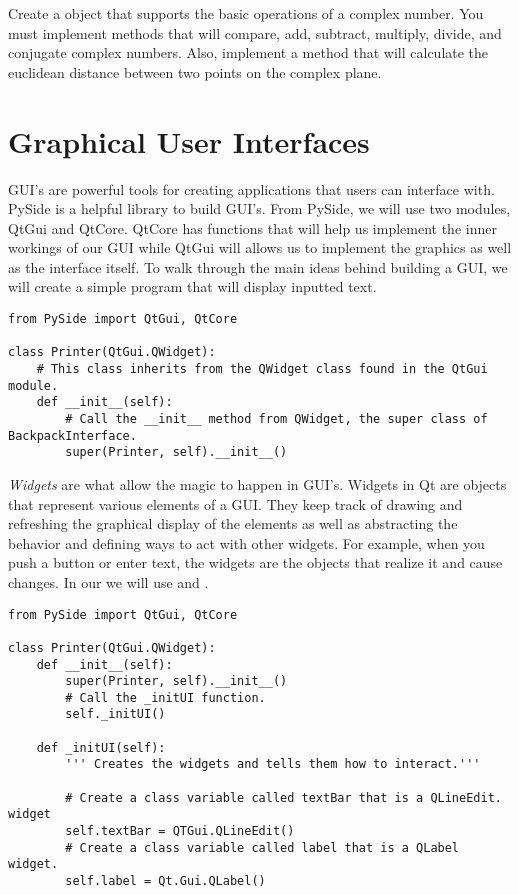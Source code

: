 \begin{problem}
Create a  object that supports the basic operations of a complex number.
You must implement methods that will compare, add, subtract, multiply, divide, and conjugate complex numbers.
Also, implement a  method that will calculate the euclidean distance between two points on the complex plane.
\label{prob:complexNum}
\end{problem}

\section*{Graphical User Interfaces}

GUI's are powerful tools for creating applications that users can interface with.
PySide is a helpful library to build GUI's.
From PySide, we will use two modules, QtGui and QtCore.
QtCore has functions that will help us implement the inner workings of our GUI while QtGui will allows us to implement the graphics as well as the interface itself.
To walk through the main ideas behind building a GUI, we will create a simple program that will display inputted text.

\begin{lstlisting}
from PySide import QtGui, QtCore

class Printer(QtGui.QWidget):
	# This class inherits from the QWidget class found in the QtGui module.
	def __init__(self):
		# Call the __init__ method from QWidget, the super class of BackpackInterface.
		super(Printer, self).__init__()

\end{lstlisting}

\emph{Widgets} are what allow the magic to happen in GUI's.
Widgets in Qt are objects that represent various elements of a GUI.
They keep track of drawing and refreshing the graphical display of the elements as well as abstracting the behavior and defining ways to act with other widgets.
For example, when you push a button or enter text, the widgets are the objects that realize it and cause changes.
In our  we will use  and .

\begin{lstlisting}
from PySide import QtGui, QtCore

class Printer(QtGui.QWidget):
	def __init__(self):
		super(Printer, self).__init__()
		# Call the _initUI function.
		self._initUI()
	
	def _initUI(self):
		''' Creates the widgets and tells them how to interact.'''
		
		# Create a class variable called textBar that is a QLineEdit. widget
		self.textBar = QTGui.QLineEdit()
		# Create a class variable called label that is a QLabel widget.
		self.label = Qt.Gui.QLabel()

\end{lstlisting}

